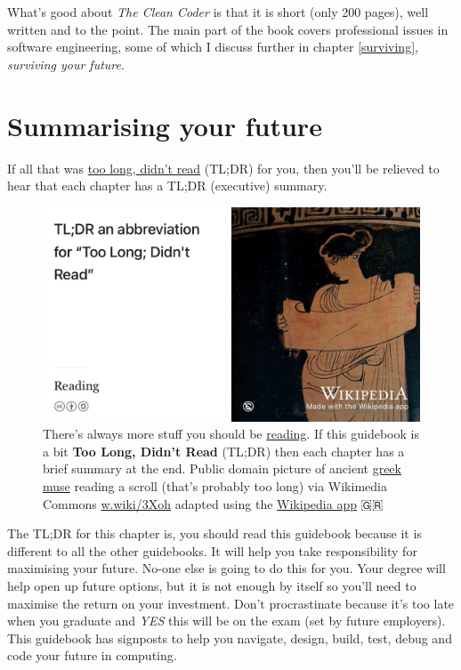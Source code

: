 \documentclass[
]{book}
\begin{document}
What's good about \emph{The Clean Coder} is that it is short (only 200 pages), well written and to the point. The main part of the book covers professional issues in software engineering, some of which I discuss further in chapter \ref{surviving}, \emph{surviving your future}.

\hypertarget{tldr1}{%
\section{Summarising your future}\label{tldr1}}

If all that was \href{https://en.wiktionary.org/wiki/too_long;_didn\%27t_read}{too long, didn't read} (TL;DR) for you, then you'll be relieved to hear that each chapter has a TL;DR (executive) summary.

\begin{figure}

{\centering \includegraphics[width=1\linewidth]{images/tldr} 

}

\caption{There's always more stuff you should be \href{https://en.wikipedia.org/wiki/Reading}{reading}. If this guidebook is a bit \textbf{Too Long, Didn't Read} (TL;DR) then each chapter has a brief summary at the end. Public domain picture of ancient \href{https://en.wikipedia.org/wiki/Muses}{greek muse} reading a scroll (that's probably too long) via Wikimedia Commons \href{https://w.wiki/3Xoh}{w.wiki/3Xoh} adapted using the \href{https://apps.apple.com/us/app/wikipedia/id324715238}{Wikipedia app} 🇬🇷}\label{fig:tldr-fig}
\end{figure}



The TL;DR for this chapter is, you should read this guidebook because it is different to all the other guidebooks. It will help you take responsibility for maximising your future. No-one else is going to do this for you. Your degree will help open up future options, but it is not enough by itself so you'll need to maximise the return on your investment. Don't procrastinate because it's too late when you graduate and \emph{YES} this will be on the exam (set by future employers). This guidebook has signposts to help you navigate, design, build, test, debug and code your future in computing.
\end{document}
